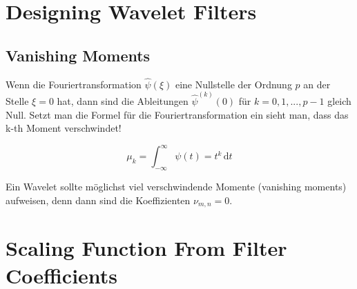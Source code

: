 \section{Designing Wavelet Filters}

\subsection{Vanishing Moments}
 Wenn die Fouriertransformation $\hat{\psi}(\xi)$ eine Nullstelle der Ordnung $p$ an der Stelle $\xi = 0$ hat, dann sind die Ableitungen $\hat{\psi}^{(k)}(0)$ für $k=0,1,...,p-1$ gleich Null. Setzt man die Formel für die Fouriertransformation ein sieht man, dass das k-th Moment verschwindet!

\[ 
	\mu_k = \int_{-\infty}^{\infty} \psi(t) = t^k \, \mathrm{d}t
\]

Ein Wavelet sollte möglichst viel verschwindende Momente (vanishing moments) aufweisen, denn dann sind die Koeffizienten $\nu_{m,n} = 0$.



\section{Scaling Function From Filter Coefficients}